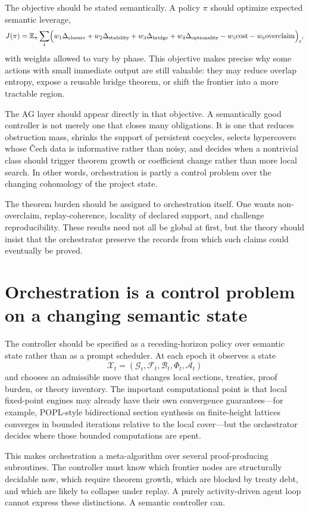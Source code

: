 \documentclass[11pt]{report}
\begin{document}
The objective should be stated semantically. A policy $\pi$ should optimize expected semantic leverage,
\[
J(\pi) = \mathbb{E}_\pi \sum_t
\Bigl(
w_1 \Delta_{\mathrm{closure}}
+ w_2 \Delta_{\mathrm{stability}}
+ w_3 \Delta_{\mathrm{bridge}}
+ w_4 \Delta_{\mathrm{optionality}}
- w_5 \mathrm{cost}
- w_6 \mathrm{overclaim}
\Bigr)_t,
\]
with weights allowed to vary by phase. This objective makes precise why some actions with small immediate output are still valuable: they may reduce overlap entropy, expose a reusable bridge theorem, or shift the frontier into a more tractable region.

The AG layer should appear directly in that objective. A semantically good controller is not merely one that closes many obligations. It is one that reduces obstruction mass, shrinks the support of persistent cocycles, selects hypercovers whose \v{C}ech data is informative rather than noisy, and decides when a nontrivial class should trigger theorem growth or coefficient change rather than more local search. In other words, orchestration is partly a control problem over the changing cohomology of the project state.

The theorem burden should be assigned to orchestration itself. One wants non-overclaim, replay-coherence, locality of declared support, and challenge reproducibility. These results need not all be global at first, but the theory should insist that the orchestrator preserve the records from which such claims could eventually be proved.
\section{Orchestration is a control problem on a changing semantic state}
The controller should be specified as a receding-horizon policy over semantic state rather than as a prompt scheduler. At each epoch it observes a state
\[
\mathcal{X}_t = (\mathcal{G}_t, \mathcal{F}_t, \mathcal{B}_t, \Phi_t, \mathcal{A}_t)
\]
and chooses an admissible move that changes local sections, treaties, proof burden, or theory inventory. The important computational point is that local fixed-point engines may already have their own convergence guarantees---for example, POPL-style bidirectional section synthesis on finite-height lattices converges in bounded iterations relative to the local cover---but the orchestrator decides where those bounded computations are spent.

This makes orchestration a meta-algorithm over several proof-producing subroutines. The controller must know which frontier nodes are structurally decidable now, which require theorem growth, which are blocked by treaty debt, and which are likely to collapse under replay. A purely activity-driven agent loop cannot express these distinctions. A semantic controller can.
\end{document}

